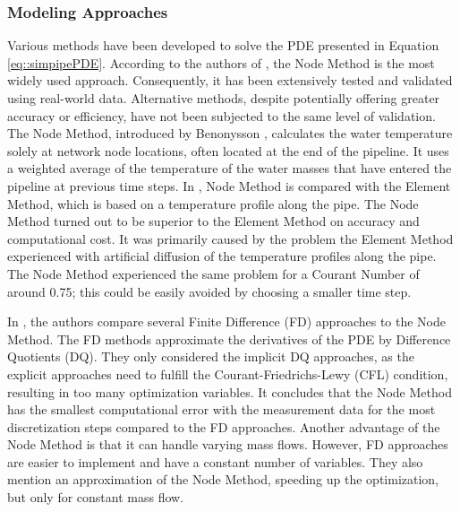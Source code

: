 \subsubsection{Modeling Approaches}\label{sec::thermodynamicmethods}
Various methods have been developed to solve the PDE presented in Equation \ref{eq::simpipePDE}. According to the authors of \cite{KUNTUAROVA}, the Node Method is the most widely used approach. Consequently, it has been extensively tested and validated using real-world data. Alternative methods, despite potentially offering greater accuracy or efficiency, have not been subjected to the same level of validation. The Node Method, introduced by Benonysson \cite{BENONYSSON1995297}, calculates the water temperature solely at network node locations, often located at the end of the pipeline. It uses a weighted average of the temperature of the water masses that have entered the pipeline at previous time steps. In \cite{NMvsEM}, Node Method is compared with the Element Method, which is based on a temperature profile along the pipe. The Node Method turned out to be superior to the Element Method on accuracy and computational cost. It was primarily caused by the problem the Element Method experienced with artificial diffusion of the temperature profiles along the pipe. The Node Method experienced the same problem for a Courant Number of around 0.75; this could be easily avoided by choosing a smaller time step. 

In \cite{MAURER2021244}, the authors compare several Finite Difference (FD) approaches to the Node Method. The FD methods approximate the derivatives of the PDE by Difference Quotients (DQ). They only considered the implicit DQ approaches, as the explicit approaches need to fulfill the Courant-Friedrichs-Lewy (CFL) condition, resulting in too many optimization variables. It concludes that the Node Method has the smallest computational error with the measurement data for the most discretization steps compared to the FD approaches. Another advantage of the Node Method is that it can handle varying mass flows. However, FD approaches are easier to implement and have a constant number of variables. They also mention an approximation of the Node Method, speeding up the optimization, but only for constant mass flow.

